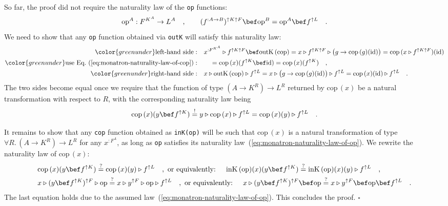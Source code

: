 So far, the proof did not require the naturality law of the \lstinline!op!
functions:
\begin{equation}
\text{op}^{A}:F^{K^{A}}\rightarrow L^{A}\quad,\quad\quad(f^{:A\rightarrow B})^{\uparrow K\uparrow F}\bef\text{op}^{B}=\text{op}^{A}\bef f^{\uparrow L}\quad.\label{eq:monatron-naturality-law-of-op}
\end{equation}
 We need to show that any \lstinline!op! function obtained via \lstinline!outK!
will satisfy this naturality law:
\begin{align*}
{\color{greenunder}\text{left-hand side}:}\quad & x^{:F^{K^{A}}}\triangleright f^{\uparrow K\uparrow F}\bef\text{outK}\,(\text{cop})=x\triangleright f^{\uparrow K\uparrow F}\triangleright\big(g\rightarrow\text{cop}\,(g)(\text{id})\big)=\text{cop}\,(x\triangleright f^{\uparrow K\uparrow F})(\text{id})\\
{\color{greenunder}\text{use Eq.~(\ref{eq:monatron-naturality-law-of-cop})}:}\quad & \quad=\text{cop}\,(x)(f^{\uparrow K}\bef\text{id})=\text{cop}\,(x)(f^{\uparrow K})\quad,\\
{\color{greenunder}\text{right-hand side}:}\quad & x\triangleright\text{outK}\,(\text{cop})\triangleright f^{\uparrow L}=x\triangleright\big(g\rightarrow\text{cop}\,(g)(\text{id})\big)\triangleright f^{\uparrow L}=\text{cop}\,(x)(\text{id})\triangleright f^{\uparrow L}\quad.
\end{align*}
The two sides become equal once we require that the function of type
$(A\rightarrow K^{R})\rightarrow L^{R}$ returned by $\text{cop}\,(x)$
be a natural transformation with respect to $R$, with the corresponding
naturality law being 
\[
\text{cop}\,(x)(y\bef f^{\uparrow K})\overset{!}{=}y\triangleright\text{cop}\,(x)\triangleright f^{\uparrow L}=\text{cop}\,(x)(y)\triangleright f^{\uparrow L}\quad.
\]

It remains to show that any \lstinline!cop! function obtained as
\lstinline!inK(op)! will be such that $\text{cop}\,(x)$ is a natural
transformation of type $\forall R.\,(A\rightarrow K^{R})\rightarrow L^{R}$
for any $x^{:F^{A}}$, as long as \lstinline!op! satisfies its naturality
law~(\ref{eq:monatron-naturality-law-of-op}). We rewrite the naturality
law of $\text{cop}\,(x)$:
\begin{align*}
 & \text{cop}\,(x)(y\bef f^{\uparrow K})\overset{?}{=}\text{cop}\,(x)(y)\triangleright f^{\uparrow L}\quad,\text{ or equivalently: }\quad\text{inK}\,(\text{op})(x)(y\bef f^{\uparrow K})\overset{?}{=}\text{inK}\,(\text{op})(x)(y)\triangleright f^{\uparrow L}\quad,\\
 & x\triangleright(y\bef f^{\uparrow K})^{\uparrow F}\triangleright\text{op}\overset{?}{=}x\triangleright y^{\uparrow F}\triangleright\text{op}\triangleright f^{\uparrow L}\quad,\text{ or equivalently: }\quad x\triangleright(y\bef f^{\uparrow K})^{\uparrow F}\bef\text{op}\overset{?}{=}x\triangleright y^{\uparrow F}\bef\text{op}\bef f^{\uparrow L}\quad.
\end{align*}
The last equation holds due to the assumed law~(\ref{eq:monatron-naturality-law-of-op}).
This concludes the proof. $\square$

